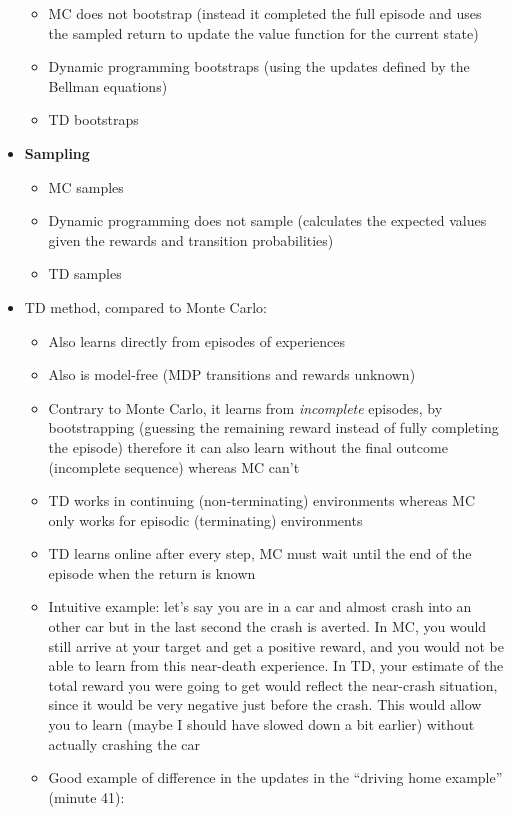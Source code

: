 \documentclass{article}
\begin{document}
\begin{itemize}
\begin{itemize}
        \item MC does not bootstrap (instead it completed the full episode and uses the sampled return to update the value function for the current state)
        \item Dynamic programming bootstraps (using the updates defined by the Bellman equations)
        \item TD bootstraps
    \end{itemize}
    \item \textbf{Sampling}
    \begin{itemize}
        \item MC samples
        \item Dynamic programming does not sample (calculates the expected values given the rewards and transition probabilities)
        \item TD samples
    \end{itemize}
    \item TD method, compared to Monte Carlo:
    \begin{itemize}
        \item Also learns directly from episodes of experiences
        \item Also is model-free (MDP transitions and rewards unknown)
        \item Contrary to Monte Carlo, it learns from \textit{incomplete} episodes, by bootstrapping (guessing the remaining reward instead of fully completing the episode) therefore it can also learn without the final outcome (incomplete sequence) whereas MC can't
        \item TD works in continuing (non-terminating) environments whereas MC only works for episodic (terminating) environments
        \item TD learns online after every step, MC must wait until the end of the episode when the return is known
        \item Intuitive example: let's say you are in a car and almost crash into an other car but in the last second the crash is averted. In MC, you would still arrive at your target and get a positive reward, and you would not be able to learn from this near-death experience. In TD, your estimate of the total reward you were going to get would reflect the near-crash situation, since it would be very negative just before the crash. This would allow you to learn (maybe I should have slowed down a bit earlier) without actually crashing the car
        \item Good example of difference in the updates in the ``driving home example'' (minute 41):

\end{itemize}
\end{itemize}
\end{document}
